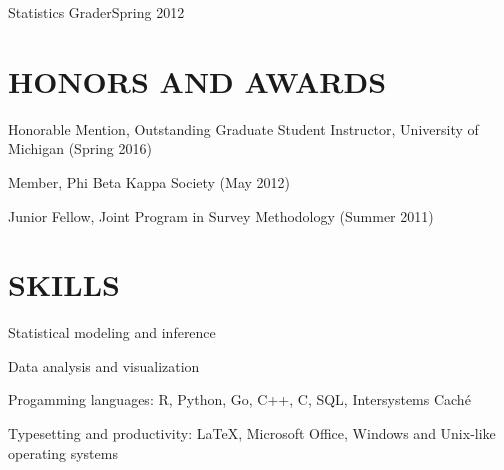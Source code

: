 \documentclass[letterpaper, 11pt]{article}
\begin{document}
\hspace{15pt}Statistics Grader\hfill Spring 2012

\vspace{18pt}
\section{HONORS AND AWARDS}          
Honorable Mention, Outstanding Graduate Student Instructor, University of Michigan (Spring 2016)

Member, Phi Beta Kappa Society (May 2012)

Junior Fellow, Joint Program in Survey Methodology (Summer 2011)
   
\section{SKILLS}
Statistical modeling and inference

Data analysis and visualization

Progamming languages:  R, Python, Go, C++, C, SQL, Intersystems Cach\'{e}

Typesetting and productivity:  \LaTeX, Microsoft Office, Windows and Unix-like operating systems

\label{sec:lastpage}
\end{document}
